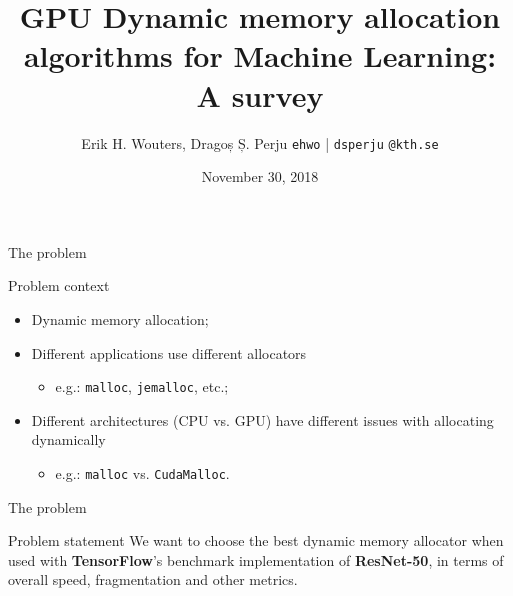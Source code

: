\documentclass[10pt]{beamer}
\title{GPU Dynamic memory allocation algorithms for Machine Learning: A survey}
\author{Erik H. Wouters, Dragoș Ș. Perju \quad \texttt{ehwo} | \texttt{dsperju}  \texttt{@kth.se}}
\date{November 30, 2018}
\institute{KTH Royal University of Technology \quad Stockholm, Sweden}
\begin{document}
\maketitle



\begin{frame}[fragile]{The problem}


\begin{exampleblock}{Problem context}
 \begin{itemize}
 \item Dynamic memory allocation;
 \item Different applications use different allocators
     \begin{itemize}
         \item e.g.: \texttt{malloc}, \texttt{jemalloc}, etc.;
     \end{itemize}
 \item Different architectures (CPU vs. GPU) have different issues with allocating dynamically
     \begin{itemize}
         \item e.g.: \texttt{malloc} vs. \texttt{CudaMalloc}.
     \end{itemize}
 \end{itemize}
\end{exampleblock}
\end{frame}

\begin{frame}[fragile]{The problem}


\begin{alertblock}{Problem statement}
 We want to choose the best dynamic memory allocator when used with \textbf{TensorFlow}'s benchmark implementation of \textbf{ResNet-50}, in terms of overall speed, fragmentation and other metrics.
\end{alertblock}
\end{frame}
\end{document}
